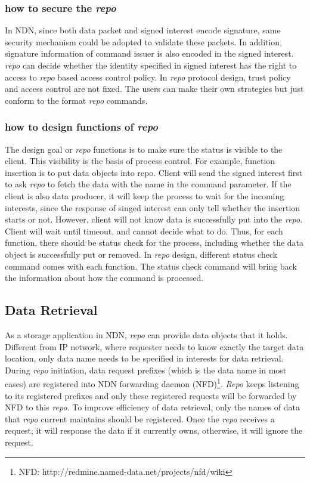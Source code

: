 \documentclass[conference]{IEEEtran}
\begin{document}
\subsubsection{how to secure the \emph{repo}}

In NDN, since both data packet and signed interest encode signature, same security mechanism could be adopted to validate these packets. In addition, signature information of command issuer is also encoded in the signed interest. \emph{repo} can decide whether the identity specified in signed interest has the right to access to \emph{repo} based access control policy. In \emph{repo} protocol design, trust policy and access control are not fixed. The users can make their own strategies but just conform to the format \emph{repo} commands.

\subsubsection{how to design functions of \emph{repo}}

The design goal or \emph{repo} functions is to make sure the status is visible to the client. This visibility is the basis of process control. For example, function insertion is to put data objects into repo. Client will send the signed interest first to ask \emph{repo} to fetch the data with the name in the command parameter. If the client is also data producer, it will keep the process to wait for the incoming interests, since the response of singed interest can only tell whether the insertion starts or not. However, client will not know data is successfully put into the \emph{repo}. Client will wait until timeout, and cannot decide what to do. Thus, for each function, there should be status check for the process, including whether the data object is successfully put or removed. In \emph{repo} design, different status check command comes with each function. The status check command will bring back the information about how the command is processed.

\subsection{Data Retrieval}

As a storage application in NDN, \emph{repo} can provide data objects that it holds. Different from IP network, where requester needs to know exactly the target data location, only data name needs to be specified in interests for data retrieval. During \emph{repo} initiation, data request prefixes (which is the data name in most cases) are registered into NDN forwarding daemon (NFD)\footnote{NFD: http://redmine.named-data.net/projects/nfd/wiki}. \emph{Repo} keeps listening to its registered prefixes and only these registered requests will be forwarded by NFD to this \emph{repo}. To improve efficiency of data retrieval, only the names of data that \emph{repo} current maintains should be registered. Once the \emph{repo} receives a request, it will response the data if it currently owns, otherwise, it will ignore the request.
\end{document}
